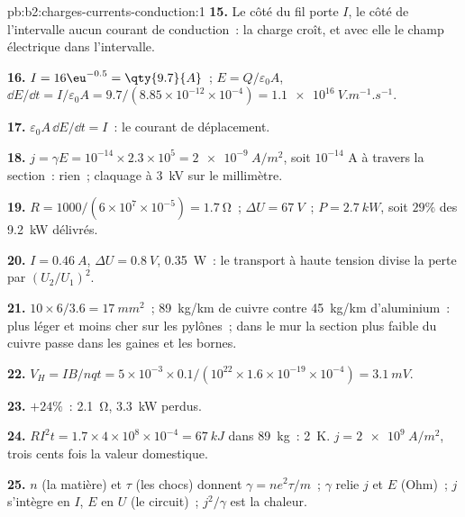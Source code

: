 \begin{solution}{pb:b2:charges-currents-conduction:1}
\textbf{15.} Le côté du fil porte $I$, le côté de l'intervalle aucun courant de
conduction~: la charge croît, et avec elle le champ électrique dans l'intervalle.

\textbf{16.} $I = 16\eu^{-0.5} = \qty{9.7}{A}$~; $E = Q/\varepsilon_0A$, $\dd E/\dd t = I/\varepsilon_0A
= 9.7/(8.85 \times 10^{-12} \times 10^{-4}) = \qty{1.1e16}{V.m^{-1}.s^{-1}}$.

\textbf{17.} $\varepsilon_0A\,\dd E/\dd t = I$~: le courant de déplacement.

\textbf{18.} $j = \gamma E = 10^{-14} \times 2.3 \times 10^5 = \qty{2e-9}{A/m^2}$, soit $10^{-14}$ A
à travers la section~: rien~; claquage à \qty{3}{kV} sur le millimètre.

\textbf{19.} $R = 1000/(6 \times 10^7 \times 10^{-5}) = \qty{1.7}{\ohm}$~; $\Delta U = \qty{67}{V}$~; $P =
\qty{2.7}{kW}$, soit $29\%$ des \qty{9.2}{kW} délivrés.

\textbf{20.} $I = \qty{0.46}{A}$, $\Delta U = \qty{0.8}{V}$, \qty{0.35}{W}~: le transport à
haute tension divise la perte par $(U_2/U_1)^2$.

\textbf{21.} $10 \times 6/3.6 = \qty{17}{mm^2}$~; \qty{89}{kg/km} de cuivre contre
\qty{45}{kg/km} d'aluminium~: plus léger et moins cher sur les pylônes~; dans le mur
la section plus faible du cuivre passe dans les gaines et les bornes.

\textbf{22.} $V_H = IB/nqt = 5 \times 10^{-3} \times 0.1/(10^{22} \times 1.6 \times 10^{-19} \times 10^{-4}) =
\qty{3.1}{mV}$.

\textbf{23.} $+24\%$~: \qty{2.1}{\ohm}, \qty{3.3}{kW} perdus.

\textbf{24.} $RI^2t = 1.7 \times 4 \times 10^8 \times 10^{-4} = \qty{67}{kJ}$ dans \qty{89}{kg}~: \qty{2}{K}.
$j = \qty{2e9}{A/m^2}$, trois cents fois la valeur domestique.

\textbf{25.} $n$ (la matière) et $\tau$ (les chocs) donnent $\gamma = ne^2\tau/m$~;
$\gamma$ relie $j$ et $E$ (Ohm)~; $j$ s'intègre en $I$, $E$ en $U$ (le
circuit)~; $j^2/\gamma$ est la chaleur.
\end{solution}
